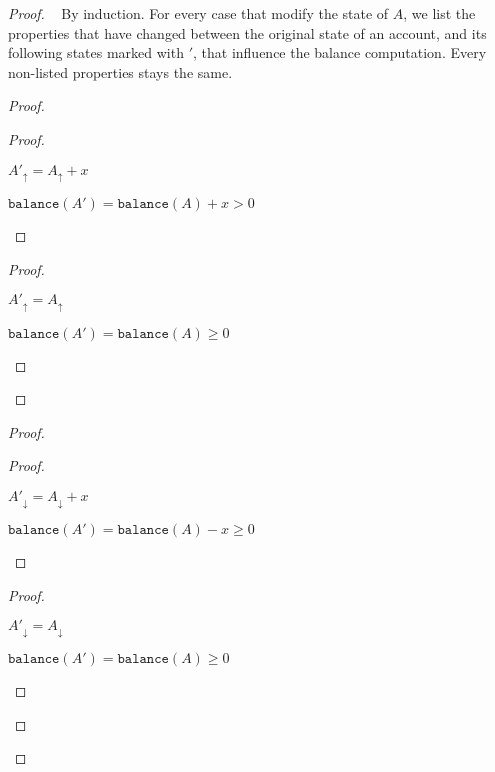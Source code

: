 \documentclass[9pt, oneside]{article}   	%
\begin{document}
\begin{proof}
\pfsketch~ By induction.
	For every case that modify the state of $A$, we list the properties that have changed between the original state of an account, and its following states marked with $'$, that influence the balance computation. Every non-listed properties stays the same.
		
	\begin{proof}
		\begin{proof}
			\begin{pfenum}
				\item $A'_\uparrow = A_\uparrow + x$
				\item $\texttt{balance}(A') = \texttt{balance}(A) + x > 0$
			\end{pfenum}
		\end{proof}
		
		\begin{proof}
			\begin{pfenum}
				\item $A'_\uparrow = A_\uparrow$
				\item $\texttt{balance}(A') = \texttt{balance}(A) \geq 0$
			\end{pfenum}
		\end{proof}		
	\end{proof}
	
	\begin{proof}
		\begin{proof}
			\begin{pfenum}
				\item $A'_\downarrow = A_\downarrow + x$
				\item $\texttt{balance}(A') = \texttt{balance}(A) - x \geq 0$
			\end{pfenum}
		\end{proof}
		
		\begin{proof}
			\begin{pfenum}
				\item $A'_\downarrow = A_\downarrow$
				\item $\texttt{balance}(A') = \texttt{balance}(A) \geq 0$
			\end{pfenum}
		\end{proof}		
	\end{proof}
	

\end{proof}
\end{document}
